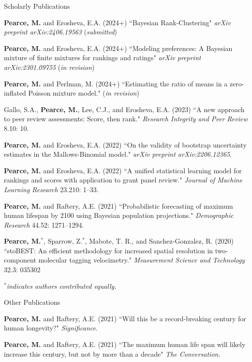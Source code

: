 \documentclass{resume} %
\begin{document}
\begin{rSection}{Scholarly Publications}

\textbf{Pearce, M.} and Erosheva, E.A. (2024+) ``Bayesian Rank-Clustering" \textit{arXiv preprint arXiv:2406.19563} (\textit{submitted})

\textbf{Pearce, M.} and Erosheva, E.A. (2024+) ``Modeling preferences: A Bayesian mixture of finite mixtures for rankings and ratings" \textit{arXiv preprint arXiv:2301.09755} (\textit{in revision})

\textbf{Pearce, M.} and Perlman, M. (2024+) ``Estimating the ratio of means in a zero-inflated Poisson mixture model." (\textit{in revision})

Gallo, S.A., \textbf{Pearce, M.}, Lee, C.J., and Erosheva, E.A. (2023) ``A new approach to peer review assessments: Score, then rank." \textit{Research Integrity and Peer Review} 8.10: 10.

\textbf{Pearce, M.} and Erosheva, E.A. (2022) ``On the validity of bootstrap uncertainty estimates in the Mallows-Binomial model." \textit{arXiv preprint arXiv:2206.12365}.

\textbf{Pearce, M.} and Erosheva, E.A. (2022) ``A unified statistical learning model for rankings and scores with application to grant panel review." \textit{Journal of Machine Learning Research} 23.210: 1--33.

\textbf{Pearce, M.} and Raftery, A.E. (2021) ``Probabilistic forecasting of maximum human lifespan by 2100 using Bayesian population projections." {\em Demographic Research} 44.52: 1271--1294.

\textbf{Pearce, M.}$^*$, Sparrow, Z.$^*$, Mabote, T. R., and Sanchez-Gonzalez, R. (2020) ``stoBEST: An efficient methodology for increased spatial resolution in two-component molecular tagging velocimetry." {\em Measurement Science and Technology} 32.3: 035302

{\em $^*$indicates authors contributed equally.}
\end{rSection}

\begin{rSection}{Other Publications}

\textbf{Pearce, M.} and Raftery, A.E. (2021) ``Will this be a record-breaking century for human longevity?" {\em Significance}.

\textbf{Pearce, M.} and Raftery, A.E. (2021) ``The maximum human life span will likely increase this century, but not by more than a decade" {\em The Conversation}.

\end{rSection}
\end{document}
